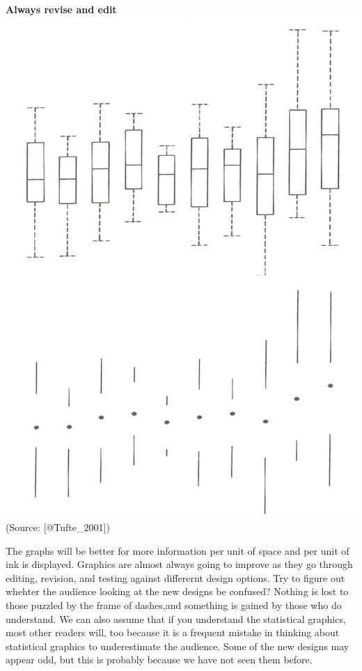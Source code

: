 \documentclass[]{book}
\theoremstyle{definition}
\theoremstyle{definition}
\theoremstyle{definition}
\theoremstyle{remark}
\begin{document}
\textbf{Always revise and edit}
\includegraphics{images/Tufte_figure4.png} (Source: {[}@Tufte\_2001{]})

The graphs will be better for more information per unit of space and per
unit of ink is displayed. Graphics are almost always going to improve as
they go through editing, revision, and testing against differernt design
options. Try to figure out whehter the audience looking at the new
designs be confused? Nothing is lost to those puzzled by the frame of
dashes,and something is gained by those who do understand. We can also
assume that if you understand the statistical graphics, most other
readers will, too because it is a frequent mistake in thinking about
statistical graphics to underestimate the audience. Some of the new
designs may appear odd, but this is probably because we have not seen
them before.
\end{document}
